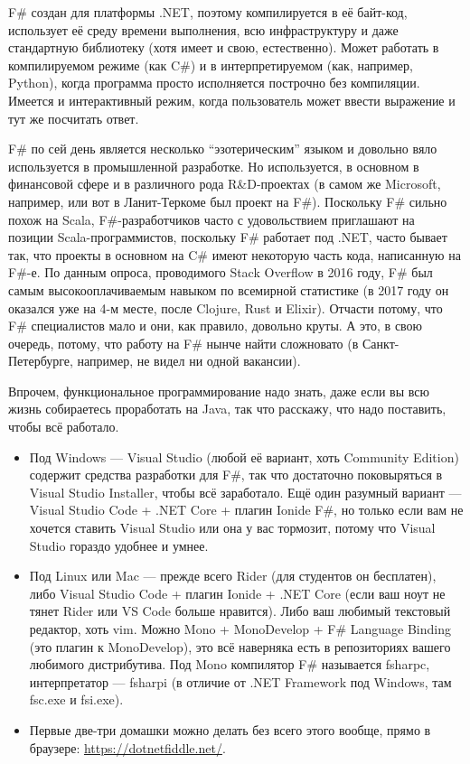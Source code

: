 \documentclass[a5paper]{article}
\begin{document}
F\# создан для платформы .NET, поэтому компилируется в её байт-код, использует её среду времени выполнения, всю инфраструктуру и даже стандартную библиотеку (хотя имеет и свою, естественно). Может работать в компилируемом режиме (как C\#) и в интерпретируемом (как, например, Python), когда программа просто исполняется построчно без компиляции. Имеется и интерактивный режим, когда пользователь может ввести выражение и тут же посчитать ответ.

F\# по сей день является несколько ``эзотерическим'' языком и довольно вяло используется в промышленной разработке. Но используется, в основном в финансовой сфере и в различного рода R\&D-проектах (в самом же Microsoft, например, или вот в Ланит-Теркоме был проект на F\#). Поскольку F\# сильно похож на Scala, F\#-разработчиков часто с удовольствием приглашают на позиции Scala-программистов, поскольку F\# работает под .NET, часто бывает так, что проекты в основном на C\# имеют некоторую часть кода, написанную на F\#-е. По данным опроса, проводимого Stack Overflow в 2016 году, F\# был самым высокооплачиваемым навыком по всемирной статистике (в 2017 году он оказался уже на 4-м месте, после Clojure, Rust и Elixir). Отчасти потому, что F\# специалистов мало и они, как правило, довольно круты. А это, в свою очередь, потому, что работу на F\# нынче найти сложновато (в Санкт-Петербурге, например, не видел ни одной вакансии).

Впрочем, функциональное программирование надо знать, даже если вы всю жизнь собираетесь проработать на Java, так что расскажу, что надо поставить, чтобы всё работало.

\begin{itemize}
	\item Под Windows --- Visual Studio (любой её вариант, хоть Community Edition) содержит средства разработки для F\#, так что достаточно поковыряться в Visual Studio Installer, чтобы всё заработало. Ещё один разумный вариант --- Visual Studio Code + .NET Core + плагин Ionide F\#, но только если вам не хочется ставить Visual Studio или она у вас тормозит, потому что Visual Studio гораздо удобнее и умнее.
	\item Под Linux или Mac --- прежде всего Rider (для студентов он бесплатен), либо Visual Studio Code + плагин Ionide + .NET Core (если ваш ноут не тянет Rider или VS Code больше нравится). Либо ваш любимый текстовый редактор, хоть vim. Можно Mono + MonoDevelop + F\# Language Binding (это плагин к MonoDevelop), это всё наверняка есть в репозиториях вашего любимого дистрибутива. Под Mono компилятор F\# называется fsharpc, интерпретатор --- fsharpi (в отличие от .NET Framework под Windows, там fsc.exe и fsi.exe).
	\item Первые две-три домашки можно делать без всего этого вообще, прямо в браузере: \url{https://dotnetfiddle.net/}.
\end{itemize}
\end{document}
